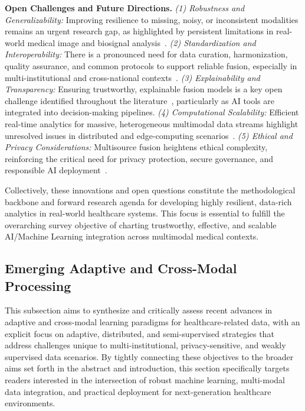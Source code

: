 \documentclass[sigconf]{acmart}
\begin{document}
\textbf{Open Challenges and Future Directions.} 
\textit{(1) Robustness and Generalizability:} Improving resilience to missing, noisy, or inconsistent modalities remains an urgent research gap, as highlighted by persistent limitations in real-world medical image and biosignal analysis~\cite{ref46,ref53,ref54,ref90}. 
\textit{(2) Standardization and Interoperability:} There is a pronounced need for data curation, harmonization, quality assurance, and common protocols to support reliable fusion, especially in multi-institutional and cross-national contexts~\cite{ref46,ref60,ref61,ref64,ref84}.
\textit{(3) Explainability and Transparency:} Ensuring trustworthy, explainable fusion models is a key open challenge identified throughout the literature~\cite{ref70,ref46,ref65,ref54,ref90}, particularly as AI tools are integrated into decision-making pipelines.
\textit{(4) Computational Scalability:} Efficient real-time analytics for massive, heterogeneous multimodal data streams highlight unresolved issues in distributed and edge-computing scenarios~\cite{ref84,ref106}.
\textit{(5) Ethical and Privacy Considerations:} Multisource fusion heightens ethical complexity, reinforcing the critical need for privacy protection, secure governance, and responsible AI deployment~\cite{ref70,ref84}.

Collectively, these innovations and open questions constitute the methodological backbone and forward research agenda for developing highly resilient, data-rich analytics in real-world healthcare systems. This focus is essential to fulfill the overarching survey objective of charting trustworthy, effective, and scalable AI/Machine Learning integration across multimodal medical contexts.

\subsection{Emerging Adaptive and Cross-Modal Processing}

This subsection aims to synthesize and critically assess recent advances in adaptive and cross-modal learning paradigms for healthcare-related data, with an explicit focus on adaptive, distributed, and semi-supervised strategies that address challenges unique to multi-institutional, privacy-sensitive, and weakly supervised data scenarios. By tightly connecting these objectives to the broader aims set forth in the abstract and introduction, this section specifically targets readers interested in the intersection of robust machine learning, multi-modal data integration, and practical deployment for next-generation healthcare environments.
\end{document}
